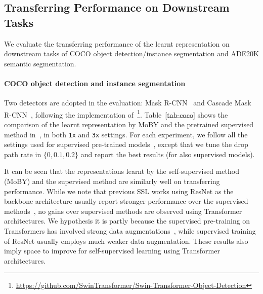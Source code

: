 \documentclass{article}
\begin{document}
\subsection{Transferring Performance on Downstream Tasks}
We evaluate the transferring performance of the learnt representation on downstream tasks of COCO object detection/instance segmentation and ADE20K semantic segmentation.

\paragraph{COCO object detection and instance segmentation}
Two detectors are adopted in the evaluation: Mask R-CNN~\citep{maskrcnn} and Cascade Mask R-CNN~\citep{cascade}, following the implementation of~\citep{swin}\footnote{\url{https://github.com/SwinTransformer/Swin-Transformer-Object-Detection}}. Table~\ref{tab-coco} shows the comparison of the learnt representation by MoBY and the pretrained supervised method in~\citep{swin}, in both \texttt{1x} and \texttt{3x} settings. For each experiment, we follow all the settings used for supervised pre-trained models~\citep{swin}, except that we tune the drop path rate in $\{0, 0.1, 0.2\}$ and report the best results (for also supervised models).

It can be seen that the representations learnt by the self-supervised method (MoBY) and the supervised method are similarly well on transferring performance. While we note that previous SSL works using ResNet as the backbone architecture usually report stronger performance over the supervised methods~\citep{moco,pixpro,henaff2021efficient}, no gains over supervised methods are observed using Transformer architectures. We hypothesis it is partly because the supervised pre-training on Transformers has involved strong data augmentations~\citep{deit,swin}, while supervised training of ResNet usually employs much weaker data augmentation. These results also imply space to improve for self-supervised learning using Transformer architectures.
\end{document}
